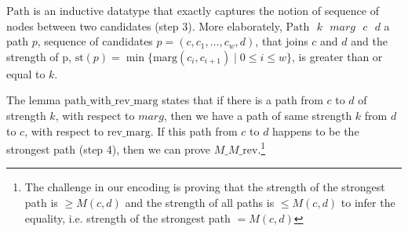 \documentclass[compsoc,conference,a4paper,10pt,times]{IEEEtran}
\begin{document}
\noindent
$\mathrm{Path}$ is an inductive datatype that exactly captures the notion of 
sequence of nodes between two candidates (step 3). More elaborately, 
$\mathrm{Path} \text{ }k \text{ }marg \text{ }c \text{ }d$ a path $p$, sequence of candidates 
$p= (c,c_{1}, \dots ,c_{w},d)$, that joins $c$ and $d$ and the strength of 
p, $\mathrm{st}(p) =  \min \lbrace \mathrm{marg} (c_i, c_{i+1}) \mid 0 
\leq i \leq w \rbrace$, is greater than or equal to $k$. 

\noindent
The lemma $\mathrm{path\_with\_rev\_marg}$ states that if there is a path from 
$c$ to $d$ of strength $k$, with respect to $marg$, then we have 
a path of same strength $k$ from $d$ to $c$, with respect to
$\mathrm{rev\_marg}$. 
If this path from $c$ to $d$ happens to be the strongest path (step 4), 
then we can prove $M\_M\_\mathrm{rev}$.\footnote{The challenge in our encoding 
is proving that the strength of the strongest path is $\geq  M(c, d)$ and 
the strength of all paths is $\leq M(c, d)$ to infer the equality, 
i.e. strength of the strongest path $= M(c, d)$}



\end{document}
